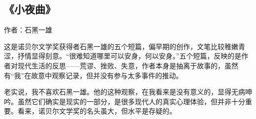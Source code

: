 \subsection{《小夜曲》}

作者：石黑一雄

这是诺贝尔文学奖获得者石黑一雄的五个短篇，偏早期的创作，文笔比较稚嫩青涩，抒情显得刻意。“很难知道哪里可以安身，何以安身。”五个短篇，反映的是作者对现代生活的反思——荒谬、挫败、失意，作者本身是抽离于故事的，虽然有“我”在故意中观察记录，但并没有参与太多事件的推动。

老实说，我不喜欢石黑一雄。他的这种观察，在我看来是没有意义的，显得无病呻吟。虽然它们确实是现实的一部分，是很多现代人的真实心理体验，但并非十分重要。看来，诺贝尔文学奖的名头虽大，但水平是存疑的。